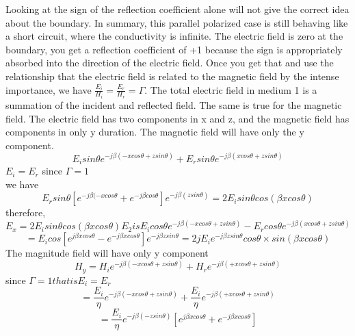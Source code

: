 Looking at the sign of the reflection coefficient alone will not give the correct idea about the boundary. In summary, this parallel polarized case is still behaving like a short circuit, where the conductivity is infinite. The electric field is zero at the boundary, you get a reflection coefficient of +1 because the sign is appropriately absorbed into the direction of the electric field. Once you get that and use the relationship that the electric field is related to the magnetic field by the intense importance, we have $\frac{E_{i}}{H_{i}} = \frac{E_{r}}{H_{r}} =\Gamma$. The total electric field in medium 1 is a summation of the incident and reflected field. The same is true for the magnetic field. The electric field has two components in x and z, and the magnetic field has components in only y duration. The magnetic field will have only the y component.
\begin{equation*}
E_{i}sin\theta e^{-j\beta(-xcos\theta + zsin\theta)} + E_{r}sin\theta e^{-j\beta(xcos\theta + zsin\theta)}
\end{equation*}
$E_{i} =E_{r}$    since $\Gamma =1$\\
we have
\begin{dmath*}
E_{r}sin\theta [e^{-j\beta(-xcos\theta} + e^{-j\beta cos\theta}] e^{-j\beta(zsin\theta)} = 2E_{i}sin\theta cos(\beta xcos\theta)
\end{dmath*}
therefore,
\begin{dmath*}
E_x = 2E_{i}sin\theta cos(\beta xcos\theta)
E_{2} is E_{i}cos\theta e^{-j\beta(-xcos\theta + zsin\theta)} - E_{r}cos\theta e^{-j\beta(xcos\theta + zsin\theta)} 
\end{dmath*}
\begin{dmath*}
= E_{i}cos[e^{j\beta xcos\theta} - e^{-j\beta xcos\theta}]e^{-j\beta zsin\theta}
=2jE_{i}e^{-j\beta zsin\theta} cos\theta \times sin(\beta xcos\theta)
\end{dmath*}
The magnitude field will have only y component
\begin{equation*}
H_{y} = H_{i}e^{-j\beta(-xcos\theta + zsin\theta)} + H_{r}e^{-j\beta(+xcos\theta + zsin\theta)}
\end{equation*}
since $\Gamma = 1 that is E_{i}=E_{r}$
\begin{equation*}
= \frac{E_{i}}{\eta} e^{-j\beta(-xcos\theta + zsin\theta)} + \frac{E_{i}}{\eta}e^{-j\beta(+xcos\theta + zsin\theta)}
\end{equation*}
\begin{equation*}
=\frac{E_{i}}{\eta} e^{-j\beta(-zsin\theta)} [e^{j\beta xcos\theta} + e^{-j\beta xcos\theta}]
\end{equation*}
